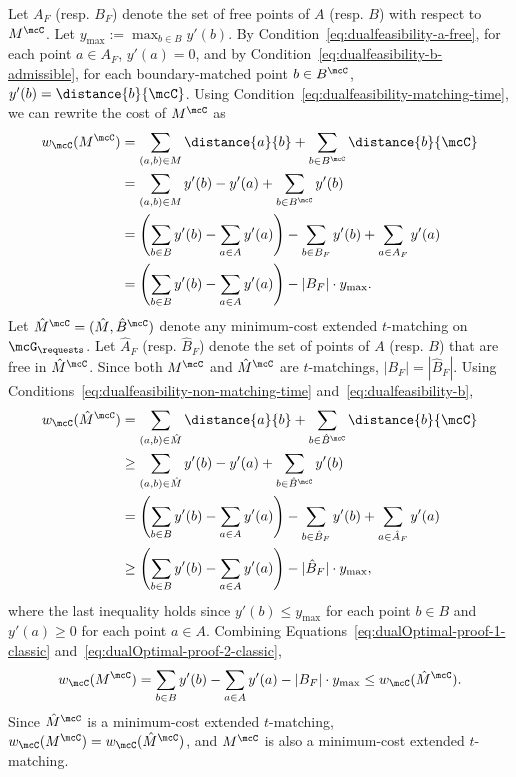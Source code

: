 Let $A_F$ (resp. $B_F$) denote the set of free points of $A$ (resp. $B$) with respect to $M^\mcC$. Let $y_{\max}:=\max_{b\in B}y'(b)$. By Condition~\eqref{eq:dualfeasibility-a-free}, for each point $a\in A_F$, $y'(a)=0$, and by Condition~\eqref{eq:dualfeasibility-b-admissible}, for each boundary-matched point $b\in B^\mcC$, $y'(b)=\distance{b}{\mcC}$.
Using Condition~\eqref{eq:dualfeasibility-matching-time}, we can rewrite the cost of $M^\mcC$ as
\begin{align}
    w_\mcC(M^\mcC) &= \sum_{(a,b)\in M} \distance{a}{b} + \sum_{b\in B^\mcC} \distance{b}{\mcC}\nonumber \\ &= \sum_{(a,b)\in M} y'(b) - y'(a) + \sum_{b\in B^\mcC} y'(b)\nonumber \\ &= \left(\sum_{b\in B} y'(b) - \sum_{a\in A} y'(a)\right) - \sum_{b\in B_F} y'(b) + \sum_{a\in A_F} y'(a)\nonumber \\ &= \left(\sum_{b\in B} y'(b) - \sum_{a\in A} y'(a)\right) - |B_F|\cdot y_{\max}.
    \label{eq:dualOptimal-proof-1-classic}
\end{align}
Let $\hat{M}^\mcC= (\hat{M}, \hat{B}^\mcC)$ denote any minimum-cost extended $t$-matching on $\mcG_\requests$. Let $\hat{A}_F$ (resp. $\hat{B}_F$) denote the set of points of $A$ (resp. $B$) that are free in $\hat{M}^\mcC$. Since both $M^\mcC$ and $\hat{M}^\mcC$ are $t$-matchings, $|B_F|=|\hat{B}_F|$. Using Conditions~\eqref{eq:dualfeasibility-non-matching-time} and~\eqref{eq:dualfeasibility-b},
\begin{align}
    w_\mcC(\hat{M}^\mcC) &= \sum_{(a,b)\in \hat{M}} \distance{a}{b} + \sum_{b\in \hat{B}^\mcC} \distance{b}{\mcC}\nonumber \\ &\ge \sum_{(a,b)\in \hat{M}} y'(b) - y'(a) + \sum_{b\in \hat{B}^\mcC} y'(b)\nonumber \\ &= \left(\sum_{b\in B} y'(b) - \sum_{a\in A} y'(a)\right) - \sum_{b\in \hat{B}_F} y'(b) + \sum_{a\in \hat{A}_F} y'(a)\nonumber \\ &\ge \left(\sum_{b\in B} y'(b) - \sum_{a\in A} y'(a)\right) - |\hat{B}_F|\cdot y_{\max},
    \label{eq:dualOptimal-proof-2-classic}
\end{align}
where the last inequality holds since $y'(b)\le y_{\max}$ for each point $b\in B$ and $y'(a)\ge 0$ for each point $a\in A$. Combining Equations~\eqref{eq:dualOptimal-proof-1-classic} and~\eqref{eq:dualOptimal-proof-2-classic},
\[w_\mcC(M^\mcC) = \sum_{b\in B} y'(b) - \sum_{a\in A} y'(a) - |B_F|\cdot y_{\max} \le w_\mcC(\hat{M}^\mcC). \]
Since $\hat{M}^\mcC$ is a minimum-cost extended $t$-matching, $w_\mcC(M^\mcC)=w_\mcC(\hat{M}^\mcC)$, and $M^\mcC$ is also a minimum-cost extended $t$-matching.



